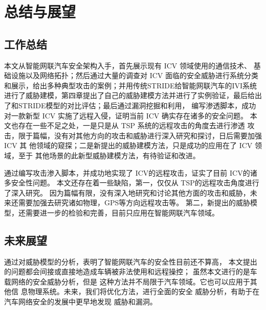 \chapter{总结与展望}
\label{ch6}

\section{工作总结}
本文从智能网联汽车安全架构入手，首先展示现有 ICV 领域使用的通信技术、
基础设施以及网络拓扑；然后通过大量的调查对 ICV 面临的安全威胁进行系统分类
和展示，给出多种典型攻击的案例；并用传统STRIDE给智能网联汽车的IVI系统进行了威胁建模，第四章提出了自己的威胁建模方法并进行了实例验证，最后给出了和STRIDE模型的对比评估；最后通过漏洞挖掘和利用，
编写渗透脚本，成功对一款新型 ICV 实施了远程入侵，证明当前 ICV 确实存在诸多的安全问题。
本文也存在一些不足之处，一是只是从 TSP 系统的远程攻击的角度去进行渗透
攻击，限于篇幅，没有对其他方向的攻击和威胁进行深入研究和探讨，日后需要加强 ICV 其
他领域的窥探；二是新提出的威胁建模方法，只是成功的应用在了 ICV 领域，至于
其他场景的此新型威胁建模方法，有待验证和改进。

通过编写攻击渗入脚本，并成功地实现了 ICV的远程攻击，证实了目前 ICV的诸多安全性问题。
本文还存在着一些缺陷，第一，仅仅从 TSP的远程攻击角度进行了深入研究。
因为篇幅有限，没有深入地研究和讨论其他方面的攻击和威胁，未来还需要加强去研究诸如物理，GPS等方向远程攻击等。
第二，新提出的威胁模型，还需要进一步的检验和完善，目前只应用在智能网联汽车领域。

\section{未来展望}
通过对威胁模型的分析，表明了智能网联汽车的安全性目前还不算高， 本文提出的问题都会间接或直接地造成车辆被非法使用和远程操控；
虽然本文进行的是车载网络的安全威胁分析，但是
这种方法并不局限于汽车领域。它也可以应用于其他信
息物理系统。未来，我们将优化方法，进行全面的安全
威胁分析，有助于在汽车网络安全的发展中更早地发现
威胁和漏洞。